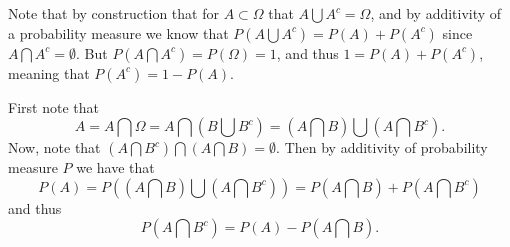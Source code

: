 



Note that by construction that for $A \subset \Omega$ that $A \bigcup A^c= \Omega$, and by additivity of a probability measure we know that $P(A\bigcup A^c)=P(A)+P(A^c)$ since $A \bigcap A^c= \emptyset$. 
But $P(A\bigcap A^c) = P(\Omega) = 1$, and thus $1 = P(A) + P(A^c)$, meaning that $P(A^c) = 1 - P(A)$.

First note that
$$
    A = A \bigcap \Omega =A\bigcap (B\bigcup B^c)=(A\bigcap B) \bigcup (A\bigcap B^c).
$$ 
Now, note that $(A\bigcap B^c) \bigcap (A\bigcap B) = \emptyset$. 
Then by additivity of probability measure $P$ we have that 
$$
P(A)=P((A\bigcap B) \bigcup (A \bigcap B^c))=P(A \bigcap B) + P( A\bigcap B^c)
$$
and thus 
$$
P(A \bigcap B^c) = P(A)-P(A \bigcap B).
$$


